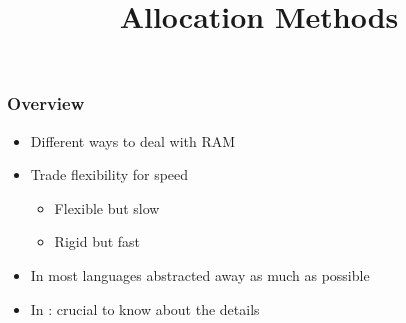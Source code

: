 \usepackage{fourier}
\usepackage{bbding}


\usetikzlibrary{shadows,shapes.multipart}

\title{Allocation Methods}







\begin{frame}
  \titlepage
\end{frame}

\begin{frame}
  \frametitle{Overview}
  \begin{itemize}
    \item Different ways to deal with RAM
    \item Trade flexibility for speed
          \begin{itemize}
            \item Flexible but slow
            \item Rigid but fast
          \end{itemize}
    \item In most languages abstracted away as much as possible
    \item In \cpp: crucial to know about the details
  \end{itemize}
\end{frame}






